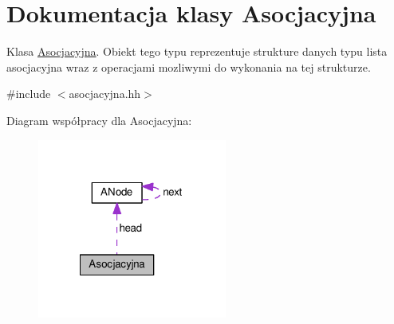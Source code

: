\hypertarget{class_asocjacyjna}{\section{Dokumentacja klasy Asocjacyjna}
\label{class_asocjacyjna}
}


Klasa \hyperlink{class_asocjacyjna}{Asocjacyjna}. Obiekt tego typu reprezentuje strukture danych typu lista asocjacyjna wraz z operacjami mozliwymi do wykonania na tej strukturze.  




{\ttfamily \#include $<$asocjacyjna.\-hh$>$}



Diagram współpracy dla Asocjacyjna\-:
\nopagebreak
\begin{figure}[H]
\begin{center}
\leavevmode
\includegraphics[width=176pt]{class_asocjacyjna__coll__graph}
\end{center}
\end{figure}
